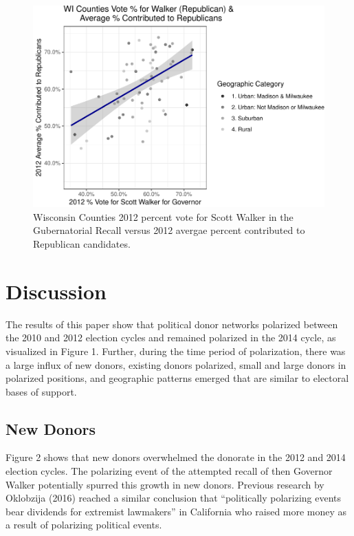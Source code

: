 \documentclass[12pt,]{article}
\begin{document}
\begin{figure}
\includegraphics[width=1\linewidth]{analysis_files/figure-latex/unnamed-chunk-22-1} \caption{Wisconsin Counties 2012 percent vote for Scott Walker in the Gubernatorial Recall versus 2012 avergae percent contributed to Republican candidates.}\label{fig:unnamed-chunk-22}
\end{figure}

\hypertarget{discussion}{%
\section{Discussion}\label{discussion}}

The results of this paper show that political donor networks polarized
between the 2010 and 2012 election cycles and remained polarized in the
2014 cycle, as visualized in Figure 1. Further, during the time period
of polarization, there was a large influx of new donors, existing donors
polarized, small and large donors in polarized positions, and geographic
patterns emerged that are similar to electoral bases of support.

\hypertarget{new-donors}{%
\subsection{New Donors}\label{new-donors}}

Figure 2 shows that new donors overwhelmed the donorate in the 2012 and
2014 election cycles. The polarizing event of the attempted recall of
then Governor Walker potentially spurred this growth in new donors.
Previous research by Oklobzija (2016) reached a similar conclusion that
``politically polarizing events bear dividends for extremist lawmakers''
in California who raised more money as a result of polarizing political
events.
\end{document}
